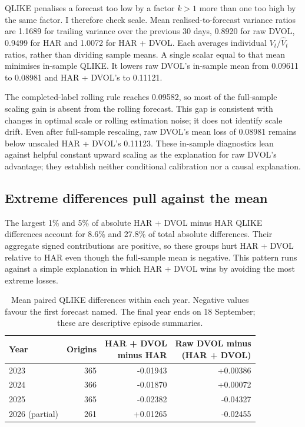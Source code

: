 \documentclass[10pt,a4paper]{article}
\newcommand{\Unit}{1}
\newcommand{\MonthlyDays}{30}
\newcommand{\EvaluationEndDay}{18}
\newcommand{\MeanQLIKEDvol}{0.09611}
\newcommand{\MeanQLIKEHardvol}{0.11123}
\newcommand{\TailOnePercent}{1}
\newcommand{\TailFivePercent}{5}
\newcommand{\TailOneSharePercent}{8.6}
\newcommand{\TailFiveSharePercent}{27.8}
\newcommand{\LeaveYearAYear}{2023}
\newcommand{\LeaveYearBYear}{2024}
\newcommand{\LeaveYearCYear}{2025}
\newcommand{\LeaveYearDYear}{2026}
\newcommand{\MeanVarianceRatioTrailing}{1.1689}
\newcommand{\MeanVarianceRatioDvol}{0.8920}
\newcommand{\MeanVarianceRatioHar}{0.9499}
\newcommand{\MeanVarianceRatioHardvol}{1.0072}
\newcommand{\MeanQLIKERescaled}{0.09582}
\newcommand{\AnnualOriginsA}{365}
\newcommand{\AnnualPrimaryA}{-0.01943}
\newcommand{\AnnualRawA}{+0.00386}
\newcommand{\AnnualOriginsB}{366}
\newcommand{\AnnualPrimaryB}{-0.01870}
\newcommand{\AnnualRawB}{+0.00072}
\newcommand{\AnnualOriginsC}{365}
\newcommand{\AnnualPrimaryC}{-0.02382}
\newcommand{\AnnualRawC}{-0.04327}
\newcommand{\AnnualOriginsD}{261}
\newcommand{\AnnualPrimaryD}{+0.01265}
\newcommand{\AnnualRawD}{-0.02455}
\newcommand{\InSampleDvolQLIKE}{0.08981}
\newcommand{\InSampleAugmentedQLIKE}{0.11121}
\begin{document}
QLIKE penalises a forecast too low by a factor $k>\Unit{}$ more than one too high by the same factor. I therefore check scale. Mean realised-to-forecast variance ratios are \MeanVarianceRatioTrailing{} for trailing variance over the previous \MonthlyDays{} days, \MeanVarianceRatioDvol{} for raw DVOL, \MeanVarianceRatioHar{} for HAR and \MeanVarianceRatioHardvol{} for HAR + DVOL. Each averages individual $V_t/\widehat V_t$ ratios, rather than dividing sample means. A single scalar equal to that mean minimises in-sample QLIKE. It lowers raw DVOL's in-sample mean from \MeanQLIKEDvol{} to \InSampleDvolQLIKE{} and HAR + DVOL's to \InSampleAugmentedQLIKE{}.

The completed-label rolling rule reaches \MeanQLIKERescaled{}, so most of the full-sample scaling gain is absent from the rolling forecast. This gap is consistent with changes in optimal scale or rolling estimation noise; it does not identify scale drift. Even after full-sample rescaling, raw DVOL's mean loss of \InSampleDvolQLIKE{} remains below unscaled HAR + DVOL's \MeanQLIKEHardvol{}. These in-sample diagnostics lean against helpful constant upward scaling as the explanation for raw DVOL's advantage; they establish neither conditional calibration nor a causal explanation.

\subsection{Extreme differences pull against the mean}

The largest \TailOnePercent{}\% and \TailFivePercent{}\% of absolute HAR + DVOL minus HAR QLIKE differences account for \TailOneSharePercent{}\% and \TailFiveSharePercent{}\% of total absolute differences. Their aggregate signed contributions are positive, so these groups hurt HAR + DVOL relative to HAR even though the full-sample mean is negative. This pattern runs against a simple explanation in which HAR + DVOL wins by avoiding the most extreme losses.

\begin{table}[H]
\centering\small
\caption{Mean paired QLIKE differences within each year. Negative values favour the first forecast named. The final year ends on \EvaluationEndDay{} September; these are descriptive episode summaries.}
\label{tab:years}
\begin{tabular}{lrrr}
\toprule
Year & Origins & \shortstack{HAR + DVOL\\minus HAR} & \shortstack{Raw DVOL minus\\(HAR + DVOL)} \\
\midrule
\LeaveYearAYear{} & \AnnualOriginsA{} & \AnnualPrimaryA{} & \AnnualRawA{} \\
\LeaveYearBYear{} & \AnnualOriginsB{} & \AnnualPrimaryB{} & \AnnualRawB{} \\
\LeaveYearCYear{} & \AnnualOriginsC{} & \AnnualPrimaryC{} & \AnnualRawC{} \\
\LeaveYearDYear{} (partial) & \AnnualOriginsD{} & \AnnualPrimaryD{} & \AnnualRawD{} \\
\bottomrule
\end{tabular}
\end{table}
\end{document}
